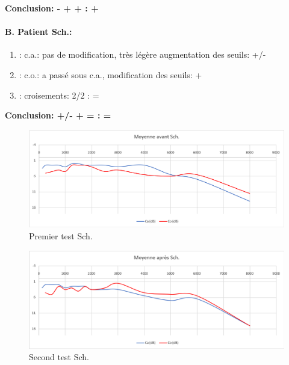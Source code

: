                 \textbf{  Conclusion:  -    +    +       :  +}




\paragraph{B. Patient Sch.:}

	\begin{enumerate}

 		\item : c.a.: pas de modification, très légère augmentation des
                  seuils: +/-
 		\item : c.o.: a passé sous c.a., modification des seuils: +
 		\item : croisements: 2/2 :     =
                   \end{enumerate}
 \textbf{  Conclusion:  +/-    +    =        :  =}

\begin{figure}[th]
\centering
\includegraphics[width=1\linewidth]{images/graphiques/schaff_pre.png}
\caption[Moyenne OG+OD]{Premier test Sch.}

\end{figure}


         \begin{figure}[th]
\centering
\includegraphics[width=1\linewidth]{images/graphiques/schaff_post.png}
\caption[Moyenne OG+OD]{Second test Sch.}

\label{groupecontroleimage1}
\end{figure}


